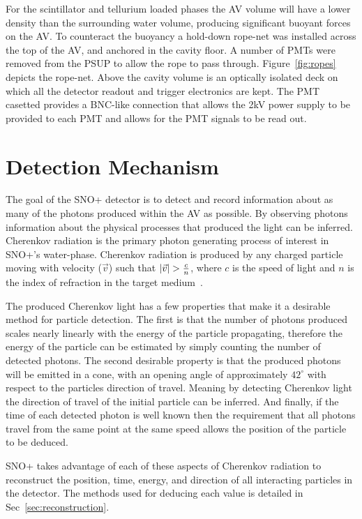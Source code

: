 For the scintillator and tellurium loaded phases the AV volume will have
a lower density than the surrounding water volume, producing significant buoyant
forces on the AV\@.
To counteract the buoyancy a hold-down rope-net was installed across the top
of the AV, and anchored in the cavity floor.
A number of PMTs were removed from the PSUP to allow the rope to pass through.
Figure~\ref{fig:ropes} depicts the rope-net.
Above the cavity volume is an optically isolated deck on which all the detector
readout and trigger electronics are kept.
The PMT casetted provides a BNC-like connection that allows the 2kV power 
supply to be provided to each PMT and allows for the PMT signals to be read
out.

\section{Detection Mechanism}
The goal of the SNO+ detector is to detect and record information about as
many of the photons produced within the AV as possible.
By observing photons information about the physical processes that produced
the light can be inferred.
Cherenkov radiation is the primary photon generating process of interest in
SNO+'s water-phase.
Cherenkov radiation is produced by any charged particle moving with
velocity ($\vec{v}$) such that $\abs{\vec{v}} > \frac{c}{n}$, where $c$ is the speed
of light and $n$ is the index of refraction in the target medium~\citep{cherenkov}.

The produced Cherenkov light has a few properties that make it a desirable
method for particle detection.
The first is that the number of photons produced scales nearly linearly
with the energy of the particle propagating, therefore the energy of the particle
can be estimated by simply counting the number of detected photons.
The second desirable property is that the produced photons will be
emitted in a cone, with an opening angle of approximately $42^{\circ}$ with
respect to the particles direction of travel.
Meaning by detecting Cherenkov light the direction of travel of the initial
particle can be inferred.
And finally, if the time of each detected photon is well known then
the requirement that all photons travel from the same point at the same speed
allows the position of the particle to be deduced.

SNO+ takes advantage of each of these aspects of Cherenkov radiation to reconstruct
the position, time, energy, and direction of all interacting particles in the
detector.
The methods used for deducing each value is detailed in Sec~\ref{sec:reconstruction}.

